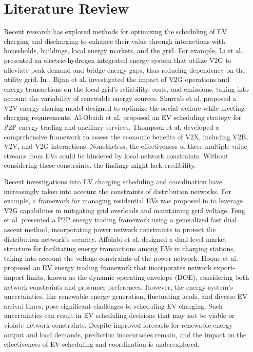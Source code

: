 \section{Literature Review}
\label{LR}

Recent research has explored methods for optimizing the scheduling of EV charging and discharging to enhance their value through interactions with households, buildings, local energy markets, and the grid. For example, Li et al. \citep{li2024cooperative} presented an electric-hydrogen integrated energy system that utilize V2G to alleviate peak demand and bridge energy gaps, thus reducing dependency on the utility grid. In \citep{bibak2021influences}, Bijan et al. investigated the impact of V2G operations and energy transactions on the local grid's reliability, costs, and emissions, taking into account the variability of renewable energy sources. Shurrab et al. \citep{shurrab2021efficient} proposed a V2V energy-sharing model designed to optimize the social welfare while meeting charging requirements. Al-Obaidi et al. \citep{al2020electric} proposed an EV scheduling strategy for P2P energy trading and ancillary services. Thompson et al. \citep{thompson2020vehicle} developed a comprehensive framework to assess the economic benefits of V2X, including V2B, V2V, and V2G interactions. Nonetheless, the effectiveness of these multiple value streams from EVs could be hindered by local network constraints. Without considering these constraints, the findings might lack credibility. 

Recent investigations into EV charging scheduling and coordination have increasingly taken into account the constraints of distribution networks. For example, a framework for managing residential EVs was proposed in \citep{nizami2020coordinated} to leverage V2G capabilities in mitigating grid overloads and maintaining grid voltage. Feng et al. \citep{feng2022peer} presented a P2P energy trading framework using a generalized fast dual ascent method, incorporating power network constraints to protect the distribution network's security. Affolabi et al. \citep{affolabi2021optimal} designed a dual-level market structure for facilitating energy transactions among EVs in charging stations, taking into account the voltage constraints of the power network. Hoque et al. \citep{hoque2024framework} proposed an EV energy trading framework that incorporates network export-import limits, known as the dynamic operating envelope (DOE), considering both network constraints and prosumer preferences. However, the energy system's uncertainties, like renewable energy generation, fluctuating loads, and diverse EV arrival times, pose significant challenges to scheduling EV charging. Such uncertainties can result in EV scheduling decisions that may not be viable or violate network constraints. Despite improved forecasts for renewable energy output and load demands, prediction inaccuracies remain, and the impact on the effectiveness of EV scheduling and coordination is underexplored. 

